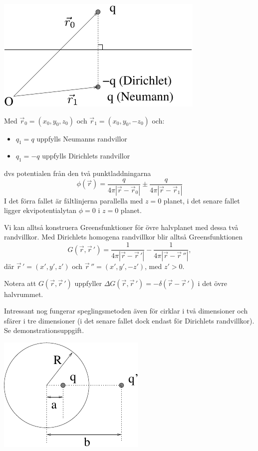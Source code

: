 \documentclass[%
oneside,                 %
final,                   %
10pt]{article}
\begin{document}
\vspace{6mm}

\centerline{\includegraphics[width=0.5\linewidth]{fig/spegling.pdf}}

\vspace{6mm}



Med $\vec{r}_0 = (x_0,y_0,z_0)$ och $\vec{r}_1 = (x_0,y_0,-z_0)$ och:
\begin{itemize}
\item $q_1 = q$ uppfylls Neumanns randvillor

\item $q_1 = -q$ uppfylls Dirichlets randvillor
\end{itemize}

\noindent
dvs potentialen från den två punktladdningarna
$$
\phi(\vec{r}) = \frac{q}{4 \pi |\vec{r} - \vec{r}_0|} \pm \frac{q}{4 \pi |\vec{r} - \vec{r}_1|}
$$
I det förra fallet är fältlinjerna parallella med $z=0$ planet, i det senare fallet ligger ekvipotentialytan $\phi=0$ i $z=0$ planet.

Vi kan alltså konstruera Greensfunktioner för övre halvplanet med dessa två randvillkor. Med Dirichlets homogena randvillkor blir alltså Greensfunktionen
$$
G (\vec{r},\vec{r}\,')=\frac{1}{4\pi|\vec{r}-\vec{r}\,'|} - \frac{1} {4\pi|\vec{r}-\vec{r}\,''|},
$$
där $\vec{r}\,' = (x',y',z')$ och $\vec{r}\,'' = (x',y',-z')$, med $z'>0$.

Notera att $G(\vec{r},\vec{r}\,')$ uppfyller $\Delta G(\vec{r},\vec{r}\,') = - \delta(\vec{r}-\vec{r}\,')$ i det övre halvrummet.

Intressant nog fungerar speglingsmetoden även för cirklar i två dimensioner och sfärer i tre dimensioner (i det senare fallet dock endast för Dirichlets randvillkor). Se demonstrationsuppgift.



\vspace{6mm}

\centerline{\includegraphics[width=0.5\linewidth]{fig/spegling2.pdf}}

\vspace{6mm}





\end{document}

